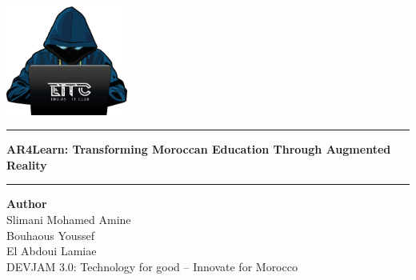 \documentclass[11pt,                                          %
a4paper,                                       %
twoside]{report}                               %
\newcommand{\theTitle}{AR4Learn: Transforming Moroccan Education Through Augmented Reality}            %
\begin{document}
	
	\begin{titlepage}                                             %
		\pagestyle{empty}                                             %
		\centering                                                    %
		\includegraphics[width=0.3\textwidth]{images/ensias_it_logo.png} \\ %
		\vspace{60mm}                                                 %
		\hrule\vspace{5mm}                                            %
		{\LARGE \textbf{\textcolor{mygreen}{\theTitle}}} \\           %
		\vspace{5mm}\hrule\vspace{20mm}                               %
		{\large \textbf{Author}} \\ \vspace{2mm}                           %
		{\large Slimani Mohamed Amine}  \\
		{\large Bouhaous Youssef}  \\
		{\large El Abdoui Lamiae}  \\
		\vfill                                                        %
		{\small DEVJAM 3.0: Technology for good – Innovate for Morocco }                %
	\end{titlepage}
	
	\tableofcontents                                              %
	
\end{document}

